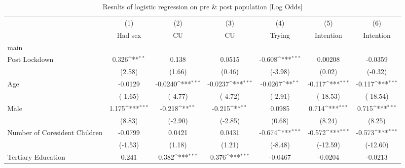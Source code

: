 \begin{table*}[htbp]\centering
\def\sym#1{\ifmmode^{#1}\else\(^{#1}\)\fi}
\caption{Results of logistic regression on pre \& post population [Log Odds]}
\hskip-4.5cm\begin{tabular}{l*{6}{c}}
\hline\hline
                    &\multicolumn{1}{c}{(1)}&\multicolumn{1}{c}{(2)}&\multicolumn{1}{c}{(3)}&\multicolumn{1}{c}{(4)}&\multicolumn{1}{c}{(5)}&\multicolumn{1}{c}{(6)}\\
                    &\multicolumn{1}{c}{Had sex}&\multicolumn{1}{c}{CU}&\multicolumn{1}{c}{CU}&\multicolumn{1}{c}{Trying}&\multicolumn{1}{c}{Intention}&\multicolumn{1}{c}{Intention}\\
\hline
main                &                     &                     &                     &                     &                     &                     \\
Post Lockdown       &       0.326\sym{**} &       0.138         &      0.0515         &      -0.608\sym{***}&     0.00208         &     -0.0359         \\
                    &      (2.58)         &      (1.66)         &      (0.46)         &     (-3.98)         &      (0.02)         &     (-0.32)         \\
[1em]
Age                 &     -0.0129         &     -0.0240\sym{***}&     -0.0237\sym{***}&     -0.0267\sym{**} &      -0.117\sym{***}&      -0.117\sym{***}\\
                    &     (-1.65)         &     (-4.77)         &     (-4.72)         &     (-2.91)         &    (-18.53)         &    (-18.54)         \\
[1em]
Male                &       1.175\sym{***}&      -0.218\sym{**} &      -0.215\sym{**} &      0.0985         &       0.714\sym{***}&       0.715\sym{***}\\
                    &      (8.83)         &     (-2.90)         &     (-2.85)         &      (0.68)         &      (8.24)         &      (8.25)         \\
[1em]
Number of Coresident Children&     -0.0799         &      0.0421         &      0.0431         &      -0.674\sym{***}&      -0.572\sym{***}&      -0.573\sym{***}\\
                    &     (-1.53)         &      (1.18)         &      (1.21)         &     (-8.48)         &    (-12.59)         &    (-12.60)         \\
[1em]
Tertiary Education  &       0.241         &       0.382\sym{***}&       0.376\sym{***}&     -0.0467         &     -0.0204         &     -0.0213         \\

\end{tabular}
\end{table*}
